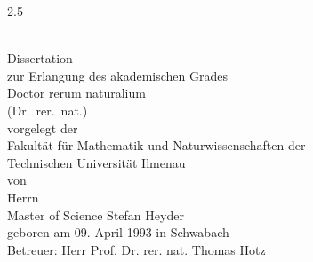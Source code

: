 \thispagestyle{empty}
\vspace*{1cm}

\begin{center}
\begin{spacing}{2.5}
    {\huge \textbf{\myTitle}}\\[0.5cm]
\end{spacing}
{\large \mySubtitle}\\[1cm]

{\Large Dissertation}\\[0.5cm]

zur Erlangung des akademischen Grades\\[0.5cm]

{\Large Doctor rerum naturalium\\[0.5cm](Dr.\ rer.\ nat.)}\\[1cm]

vorgelegt der\\[0.5cm]

{\large Fakultät für Mathematik und Naturwissenschaften der\\[0.3cm]
Technischen Universität Ilmenau}\\[1cm]

von\\[0.5cm]

{\normalsize Herrn }\\[0.5cm]

{\large Master of Science Stefan Heyder }\\[0.3cm]

geboren am 09. April 1993 in Schwabach\\[1cm]

{\large Betreuer: Herr Prof. Dr. rer. nat. Thomas Hotz}\\[1cm]

\end{center}